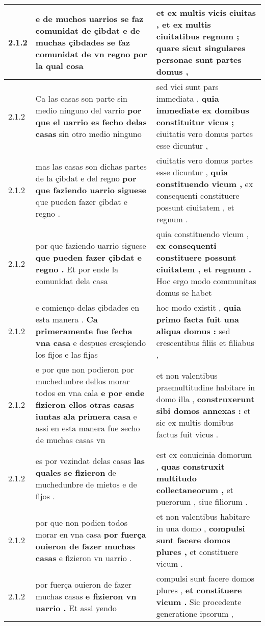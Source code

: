 \begin{tabular}{|p{1cm}|p{6.5cm}|p{6.5cm}|}
2.1.2 & e de muchos uarrios se faz comunidat de çibdat \textbf{ e de muchas çibdades se faz comunidat de vn regno } por la qual cosa & et ex multis vicis ciuitas , \textbf{ et ex multis ciuitatibus regnum ; } quare sicut singulares personae sunt partes domus , \\\hline
2.1.2 & Ca las casas son parte sin medio ninguno del varrio \textbf{ por que el uarrio es fecho delas casas } sin otro medio ninguno & sed vici sunt pars immediata , \textbf{ quia immediate ex domibus constituitur vicus ; } ciuitatis vero domus partes esse dicuntur , \\\hline
2.1.2 & mas las casas son dichas partes de la çibdat e del regno \textbf{ por que faziendo uarrio siguese } que pueden fazer çibdat e regno . & ciuitatis vero domus partes esse dicuntur , \textbf{ quia constituendo vicum , } ex consequenti constituere possunt ciuitatem , et regnum . \\\hline
2.1.2 & por que faziendo uarrio siguese \textbf{ que pueden fazer çibdat e regno . } Et por ende la comunidat dela casa & quia constituendo vicum , \textbf{ ex consequenti constituere possunt ciuitatem , et regnum . } Hoc ergo modo communitas domus se habet \\\hline
2.1.2 & e comienço delas çibdades en esta manera . \textbf{ Ca primeramente fue fecha vna casa } e despues cresçiendo los fijos e las fijas & hoc modo existit , \textbf{ quia primo facta fuit una aliqua domus : } sed crescentibus filiis et filiabus , \\\hline
2.1.2 & e por que non podieron por muchedunbre dellos morar todos en vna cala \textbf{ e por ende fizieron ellos otras casas iuntas ala primera casa } e assi en esta manera fue secho de muchas casas vn & et non valentibus praemultitudine habitare in domo illa , \textbf{ construxerunt sibi domos annexas : } et sic ex multis domibus factus fuit vicus . \\\hline
2.1.2 & es por vezindat delas casas \textbf{ las quales se fizieron } de muchedunbre de mietos e de fijos . & est ex conuicinia domorum , \textbf{ quas construxit multitudo collectaneorum , } et puerorum , siue filiorum . \\\hline
2.1.2 & por que non podien todos morar en vna casa \textbf{ por fuerça ouieron de fazer muchas casas } e fizieron vn uarrio . & et non valentibus habitare in una domo , \textbf{ compulsi sunt facere domos plures , } et constituere vicum . \\\hline
2.1.2 & por fuerça ouieron de fazer muchas casas \textbf{ e fizieron vn uarrio . } Et assi yendo & compulsi sunt facere domos plures , \textbf{ et constituere vicum . } Sic procedente generatione ipsorum , \\\hline

\end{tabular}
